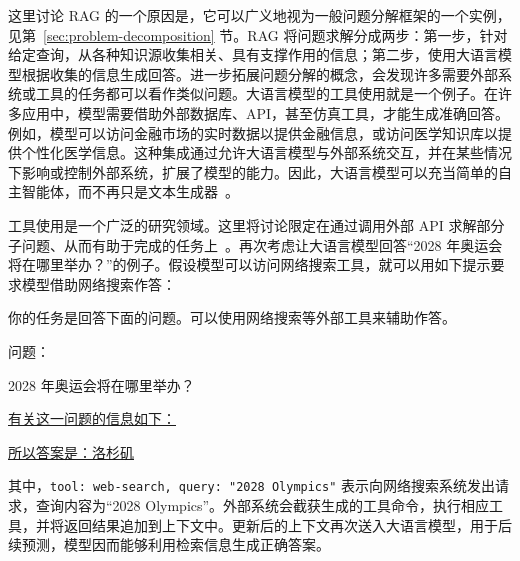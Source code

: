 这里讨论 RAG 的一个原因是，它可以广义地视为一般问题分解框架的一个实例，见第~\ref{sec:problem-decomposition} 节。RAG 将问题求解分成两步：第一步，针对给定查询，从各种知识源收集相关、具有支撑作用的信息；第二步，使用大语言模型根据收集的信息生成回答。进一步拓展问题分解的概念，会发现许多需要外部系统或工具的任务都可以看作类似问题。大语言模型的工具使用就是一个例子。在许多应用中，模型需要借助外部数据库、API，甚至仿真工具，才能生成准确回答。例如，模型可以访问金融市场的实时数据以提供金融信息，或访问医学知识库以提供个性化医学信息。这种集成通过允许大语言模型与外部系统交互，并在某些情况下影响或控制外部系统，扩展了模型的能力。因此，大语言模型可以充当简单的自主智能体，而不再只是文本生成器~\cite{franklin-and-graesser:1996agent}。

工具使用是一个广泛的研究领域。这里将讨论限定在通过调用外部 API 求解部分子问题、从而有助于完成的任务上~\cite{parisi-etal:2022talm,gao-etal:2023pal}。再次考虑让大语言模型回答“2028 年奥运会将在哪里举办？”的例子。假设模型可以访问网络搜索工具，就可以用如下提示要求模型借助网络搜索作答：

\vspace{0.5em}
\begin{tcolorbox}

\begingroup
\setlength{\leftskip}{2em}
\setlength{\rightskip}{2em}

你的任务是回答下面的问题。可以使用网络搜索等外部工具来辅助作答。

\vspace{0.5em}

问题：

\vspace{0.2em}

2028 年奥运会将在哪里举办？

\vspace{0.5em}

\underline{有关这一问题的信息如下：}

\vspace{0.2em}

\underline{}

\vspace{0.2em}

\underline{所以答案是：洛杉矶}

\endgroup

\end{tcolorbox}
\vspace{0.5em}

\noindent 其中，\texttt{{tool: web-search, query: "2028 Olympics"}} 表示向网络搜索系统发出请求，查询内容为“2028 Olympics”。外部系统会截获生成的工具命令，执行相应工具，并将返回结果追加到上下文中。更新后的上下文再次送入大语言模型，用于后续预测，模型因而能够利用检索信息生成正确答案。

